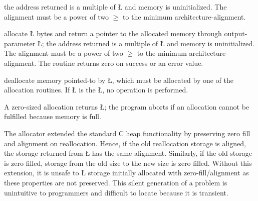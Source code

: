 \documentclass[openright,twoside]{report}
\begin{document}
\begin{description}[topsep=5pt,parsep=2pt]
the address returned is a multiple of \LGinlinetrue\LGbegin\lgrinde\L{}\endlgrinde\LGend{} and memory is uninitialized.
The alignment must be a power of two $\ge$ to the minimum architecture-alignment.
\item[\LGinlinetrue\LGbegin\lgrinde\L{\LB{\V{posix\_memalign}(\0\V{memaddr},\0\V{alignment},\0\V{size}\0)}}\endlgrinde\LGend{}] allocate \LGinlinetrue\LGbegin\lgrinde\L{}\endlgrinde\LGend{} bytes and return a pointer to the allocated memory through output-parameter \LGinlinetrue\LGbegin\lgrinde\L{}\endlgrinde\LGend{};
the address returned is a multiple of \LGinlinetrue\LGbegin\lgrinde\L{}\endlgrinde\LGend{} and memory is uninitialized.
The alignment must be a power of two $\ge$ to the minimum architecture-alignment.
The routine returns zero on success or an error value.
\item[\LGinlinetrue\LGbegin\lgrinde\L{\LB{\V{free}(\0\V{addr}\0)}}\endlgrinde\LGend{}] deallocate memory pointed-to by \LGinlinetrue\LGbegin\lgrinde\L{}\endlgrinde\LGend{}, which must be allocated by one of the allocation routines.
If \LGinlinetrue\LGbegin\lgrinde\L{}\endlgrinde\LGend{} is the \LGinlinetrue\LGbegin\lgrinde\L{}\endlgrinde\LGend{}, no operation is performed.
\end{description}
A zero-sized allocation returns \LGinlinetrue\LGbegin\lgrinde\L{}\endlgrinde\LGend{};
the program aborts if an allocation cannot be fulfilled because memory is full.

The \uC allocator extended the standard C heap functionality by preserving zero fill and alignment on reallocation.
Hence, if the old reallocation storage is aligned, the storage returned from \LGinlinetrue\LGbegin\lgrinde\L{}\endlgrinde\LGend{} has the same alignment.
Similarly, if the old storage is zero filled, storage from the old size to the new size is zero filled.
Without this extension, it is unsafe to \LGinlinetrue\LGbegin\lgrinde\L{}\endlgrinde\LGend{} storage initially allocated with zero-fill/alignment as these properties are not preserved.
This silent generation of a problem is unintuitive to programmers and difficult to locate because it is transient.
\end{document}
